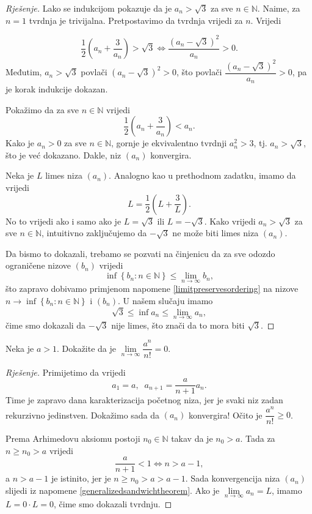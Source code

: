 \begin{proof}[Rješenje]
Lako se indukcijom pokazuje da je $a_n>\sqrt{3}$ za sve $n\in \mathbb{N}$. Naime, za $n=1$ tvrdnja je trivijalna. Pretpostavimo da tvrdnja vrijedi za $n$. Vrijedi

$$\dfrac{1}{2}\left(a_n+\dfrac{3}{a_n}\right)>\sqrt{3}\Leftrightarrow \dfrac{(a_n-\sqrt{3})^2}{a_n}>0.$$
Međutim, $a_n>\sqrt{3}$ povlači $(a_n-\sqrt{3})^2>0$, što povlači $\dfrac{(a_n-\sqrt{3})^2}{a_n}>0$, pa je korak indukcije dokazan.

Pokažimo da za sve $n\in \mathbb{N}$ vrijedi
$$\dfrac{1}{2}\left(a_n+\dfrac{3}{a_n}\right)<a_n.$$
Kako je $a_n>0$ za sve $n\in \mathbb{N}$, gornje je ekvivalentno tvrdnji $a_n^2>3$, tj. $a_n>\sqrt{3}$, što je već dokazano. Dakle, niz $(a_n)$ konvergira.

Neka je $L$ limes niza $(a_n)$. Analogno kao u prethodnom zadatku, imamo da vrijedi 
$$L=\dfrac{1}{2}\left(L+\dfrac{3}{L}\right).$$ No to vrijedi ako i samo ako je $L=\sqrt{3}$ ili $L=-\sqrt{3}$. Kako vrijedi $a_n> \sqrt{3}$ za sve $n\in \mathbb{N}$, intuitivno zaključujemo da $-\sqrt{3}$ ne može biti limes niza $(a_n)$. 

Da bismo to dokazali, trebamo se pozvati na činjenicu da za sve odozdo ograničene nizove $(b_n)$ vrijedi $$\inf\left\{b_n : n\in \mathbb{N}\right\}\leq \lim\limits_{n\to \infty}{b_n},$$ što zapravo dobivamo primjenom napomene \ref{limitpreservesordering} na nizove $n\to \inf\left\{b_n : n\in \mathbb{N}\right\}$ i $(b_n)$. U našem slučaju imamo $$\sqrt{3}\leq \inf{a_n}\leq \lim\limits_{n\to \infty}{a_n},$$ čime smo dokazali da $-\sqrt{3}$ nije limes, što znači da to mora biti $\sqrt{3}$.
\end{proof}
\begin{exercise}
Neka je $a>1$. Dokažite da je $\lim\limits_{n\to \infty}{\dfrac{a^n}{n!}}=0$.
\end{exercise}
\begin{proof}[Rješenje]
Primijetimo da vrijedi $$a_1=a,\;\;a_{n+1}=\dfrac{a}{n+1}a_{n}.$$ Time je zapravo dana karakterizacija početnog niza, jer je svaki niz zadan rekurzivno jedinstven. Dokažimo sada da $(a_n)$ konvergira! Očito je $\dfrac{a^n}{n!}\geq 0$. 

Prema Arhimedovu aksiomu postoji $n_0\in \mathbb{N}$ takav da je $n_0>a$. Tada za $n\geq n_0>a$ vrijedi $$\dfrac{a}{n+1}<1\Leftrightarrow n>a-1,$$ 
a $n>a-1$ je istinito, jer je $n\geq n_0>a>a-1$. Sada konvergencija niza $(a_n)$ slijedi iz napomene \ref{generalizedsandwichtheorem}. Ako je $\lim\limits_{n\to \infty}{a_n}=L$, imamo $L=0\cdot L=0$, čime smo dokazali tvrdnju.
\end{proof}
